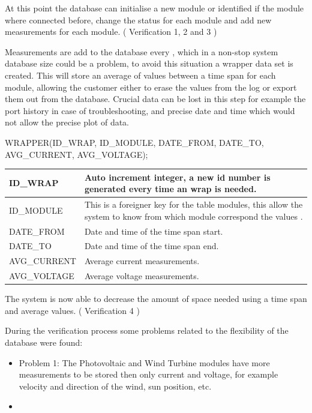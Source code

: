 At this point the database can initialise a new module or identified if the module where connected before, change the status for each module and add new measurements for each module. ( Verification 1, 2 and 3 )

Measurements are add to the database every , which in a non-stop system database size could be a problem, to avoid this situation a wrapper data set is created. This will store an average of values between a time span for each module, allowing the customer either to erase the values from the log or export them out from the database. Crucial data can be lost in this step for example the port history in case of troubleshooting, and precise date and time which would not allow the precise plot of data. 

WRAPPER(ID\_WRAP, ID\_MODULE, DATE\_FROM, DATE\_TO, AVG\_CURRENT, AVG\_VOLTAGE);

\begin{table}[H]
\centering
	\begin{tabular}{| l | p{10cm} |}
		\hline
		ID\_WRAP & Auto increment integer, a new id number is generated every time an wrap is needed. \\\hline
		ID\_MODULE & This is a foreigner key for the table modules, this allow the system to know from which module correspond the values .\\\hline
		DATE\_FROM & Date and time of the time span start. \\\hline
		DATE\_TO & Date and time of the time span end. \\\hline
		AVG\_CURRENT & Average current measurements. \\\hline
		AVG\_VOLTAGE & Average voltage measurements. \\\hline
	\end{tabular}
\end{table}

The system is now able to decrease the amount of space needed using a time span and average values. ( Verification 4 )

During the verification process some problems related to the flexibility of the database were found:
	\begin{itemize}
		\item Problem 1: The Photovoltaic and Wind Turbine modules have more measurements to be stored then only current and voltage, for example velocity and direction of the wind, sun position, etc.
		\item {}
	\end{itemize}

